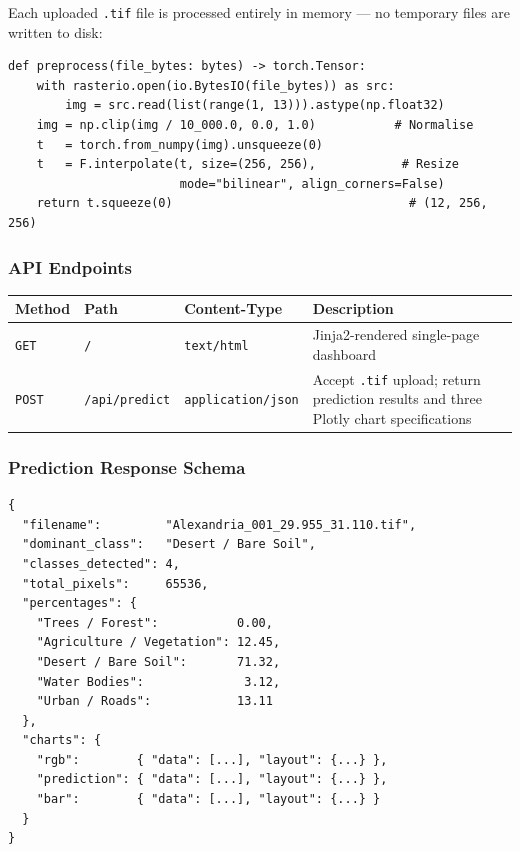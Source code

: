 \documentclass[12pt, a4paper]{article}
\newcommand{\tif}{\texttt{.tif}}
\begin{document}
Each uploaded \tif{} file is processed entirely in memory — no temporary files are written to disk:

\begin{lstlisting}[style=python, caption={Preprocessing pipeline (\texttt{preprocess} function)}]
def preprocess(file_bytes: bytes) -> torch.Tensor:
    with rasterio.open(io.BytesIO(file_bytes)) as src:
        img = src.read(list(range(1, 13))).astype(np.float32)
    img = np.clip(img / 10_000.0, 0.0, 1.0)           # Normalise
    t   = torch.from_numpy(img).unsqueeze(0)
    t   = F.interpolate(t, size=(256, 256),            # Resize
                        mode="bilinear", align_corners=False)
    return t.squeeze(0)                                 # (12, 256, 256)
\end{lstlisting}

\subsubsection{API Endpoints}

\begin{center}
\renewcommand{\arraystretch}{1.25}
\begin{tabular}{lllp{6.5cm}}
\toprule
\textbf{Method} & \textbf{Path} & \textbf{Content-Type} & \textbf{Description} \\
\midrule
\texttt{GET}  & \texttt{/}            & \texttt{text/html}         & Jinja2-rendered single-page dashboard \\
\texttt{POST} & \texttt{/api/predict} & \texttt{application/json}  & Accept \tif{} upload; return prediction results and three Plotly chart specifications \\
\bottomrule
\end{tabular}
\end{center}

\subsubsection{Prediction Response Schema}

\begin{lstlisting}[style=json, caption={JSON response from \texttt{POST /api/predict}}]
{
  "filename":         "Alexandria_001_29.955_31.110.tif",
  "dominant_class":   "Desert / Bare Soil",
  "classes_detected": 4,
  "total_pixels":     65536,
  "percentages": {
    "Trees / Forest":           0.00,
    "Agriculture / Vegetation": 12.45,
    "Desert / Bare Soil":       71.32,
    "Water Bodies":              3.12,
    "Urban / Roads":            13.11
  },
  "charts": {
    "rgb":        { "data": [...], "layout": {...} },
    "prediction": { "data": [...], "layout": {...} },
    "bar":        { "data": [...], "layout": {...} }
  }
}
\end{lstlisting}
\end{document}
